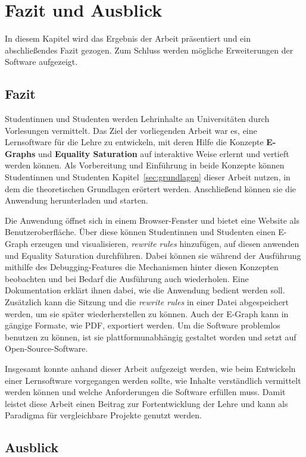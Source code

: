 \section{Fazit und Ausblick}\label{sec:fazit}

In diesem Kapitel wird das Ergebnis der Arbeit präsentiert und ein abschließendes Fazit gezogen. Zum Schluss werden mögliche Erweiterungen der Software aufgezeigt. 

\subsection{Fazit}

Studentinnen und Studenten werden Lehrinhalte an Universitäten durch Vorlesungen vermittelt. Das Ziel der vorliegenden Arbeit war es, eine Lernsoftware für die Lehre
zu entwickeln, mit deren Hilfe die Konzepte \textbf{E-Graphs} und \textbf{Equality Saturation} auf interaktive Weise erlernt und vertieft werden können.
Als Vorbereitung und Einführung in beide Konzepte können Studentinnen und Studenten Kapitel~\ref{sec:grundlagen} dieser Arbeit nutzen, in dem die theoretischen Grundlagen erörtert werden.
Anschließend können sie die Anwendung herunterladen und starten. 

Die Anwendung öffnet sich in einem Browser-Fenster und bietet eine Website als Benutzeroberfläche. Über diese können Studentinnen und Studenten einen E-Graph erzeugen und visualisieren, 
\textit{rewrite rules} hinzufügen, auf diesen anwenden und Equality Saturation durchführen. 
Dabei können sie während der Ausführung mithilfe des Debugging-Features die Mechanismen hinter diesen Konzepten beobachten und bei Bedarf die Ausführung auch wiederholen.
Eine Dokumentation erklärt ihnen dabei, wie die Anwendung bedient werden soll. Zusätzlich kann die Sitzung und die \textit{rewrite rules} in einer Datei abgespeichert werden, um
sie später wiederherstellen zu können. Auch der E-Graph kann in gängige Formate, wie PDF, exportiert werden.
Um die Software problemlos benutzen zu können, ist sie plattformunabhängig gestaltet worden und setzt auf Open-Source-Software.

Insgesamt konnte anhand dieser Arbeit aufgezeigt werden, wie beim Entwickeln einer Lernsoftware vorgegangen werden sollte, wie Inhalte verständlich vermittelt werden können und welche
Anforderungen die Software erfüllen muss.
Damit leistet diese Arbeit einen Beitrag zur Fortentwicklung der Lehre und kann als Paradigma für vergleichbare Projekte genutzt werden.

\subsection{Ausblick}

